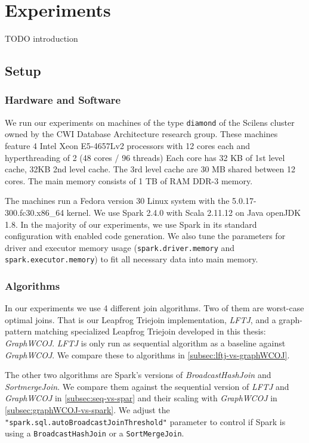 \section{Experiments}\label{sec:experiments}

TODO introduction

\subsection{Setup}

\subsubsection{Hardware and Software}

We run our experiments on machines of the type \texttt{diamond} of the Scilens cluster owned by the CWI Database Architecture research
group.
These machines feature 4 Intel Xeon E5-4657Lv2 processors with 12 cores each and hyperthreading of 2 (48 cores / 96 threads)
Each core has 32 KB of 1st level cache, 32KB 2nd level cache.
The 3rd level cache are 30 MB shared between 12 cores.
The main memory consists of 1 TB of RAM DDR-3 memory.

The machines run a Fedora version 30 Linux system with the 5.0.17-300.fc30.x86\_64 kernel.
We use Spark 2.4.0 with Scala 2.11.12 on Java openJDK 1.8.
In the majority of our experiments, we use Spark in its standard configuration with enabled code generation.
We also tune the parameters for driver and executor memory usage (\texttt{spark.driver.memory} and \texttt{spark.executor.memory}) to fit
all necessary data into main memory.

\subsubsection{Algorithms}

In our experiments we use 4 different join algorithms.
Two of them are worst-case optimal joins.
That is our Leapfrog Triejoin implementation, \textit{LFTJ}, and a graph-pattern matching
specialized Leapfrog Triejoin developed in this thesis: \textit{Graph\textsc{WCOJ}}.
\textit{LFTJ} is only run as sequential algorithm as a baseline against \textit{GraphWCOJ}.
We compare these to algorithms in \cref{subsec:lftj-vs-graphWCOJ}.

The other two algorithms are Spark's versions of \textit{BroadcastHashJoin} and \textit{SortmergeJoin}.
We compare them against the sequential version of \textit{LFTJ} and \textit{GraphWCOJ} in \cref{subsec:seq-vs-spar}
and their scaling with \textit{GraphWCOJ} in \cref{subsec:graphWCOJ-vs-spark}.
We adjust the \texttt{"spark.sql.autoBroadcastJoinThreshold"} parameter to control if Spark is using a \texttt{BroadcastHashJoin} or a \texttt{SortMergeJoin}.

